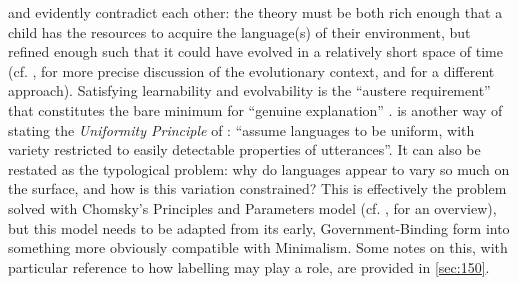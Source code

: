  and  evidently contradict each other: the theory must be both rich enough that a child has the resources to acquire the language(s) of their environment, but refined enough such that it could have evolved in a relatively short space of time (cf. , for more precise discussion of the evolutionary context, and  for a different approach). Satisfying learnability and evolvability is the ``austere requirement'' that constitutes the bare minimum for ``genuine explanation'' \parencite[14]{ChomskyN_2020a}.  is another way of stating the \textit{Uniformity Principle} of \textcite[2]{ChomskyN_2001}: ``assume languages to be uniform, with variety restricted to easily detectable properties of utterances''. It can also be restated as the typological problem: why do languages appear to vary so much on the surface, and how is this variation constrained? This is effectively the problem solved with Chomsky's Principles and Parameters model (cf. , for an overview), but this model needs to be adapted from its early, Government-Binding form \parencite{ChomskyN_1981} into something more obviously compatible with Minimalism. Some notes on this, with particular reference to how labelling may play a role, are provided in \autoref{sec:150}.
